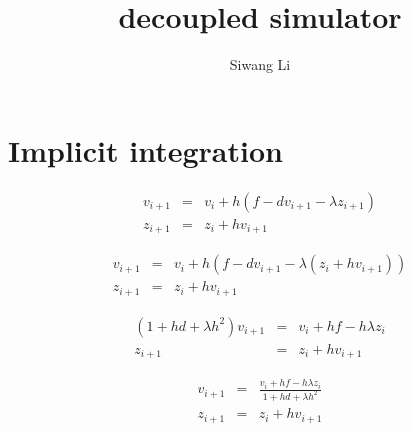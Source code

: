 \documentclass[9pt,twocolumn]{extarticle}
\author{Siwang Li}
\title{decoupled simulator}
\begin{document}
\maketitle

\setlength{\parskip}{0.5ex}

\section{Implicit integration}
\begin{eqnarray}
 v_{i+1} &=& v_{i} + h(f-dv_{i+1}-\lambda z_{i+1})\\
 z_{i+1} &=&  z_{i} + hv_{i+1}
\end{eqnarray}

\begin{eqnarray}
 v_{i+1} &=& v_{i} + h(f-dv_{i+1}-\lambda(z_{i} + hv_{i+1}))\\
 z_{i+1} &=&  z_{i} + hv_{i+1}
\end{eqnarray}

\begin{eqnarray}
 (1+hd+\lambda h^2)v_{i+1} &=& v_{i} + hf - h\lambda z_{i}\\
 z_{i+1} &=&  z_{i} + hv_{i+1}
\end{eqnarray}

\begin{eqnarray}
 v_{i+1} &=& \frac{v_{i} + hf - h\lambda z_{i}}{1+hd+\lambda h^2}\\
 z_{i+1} &=&  z_{i} + hv_{i+1}
\end{eqnarray}
\end{document}
